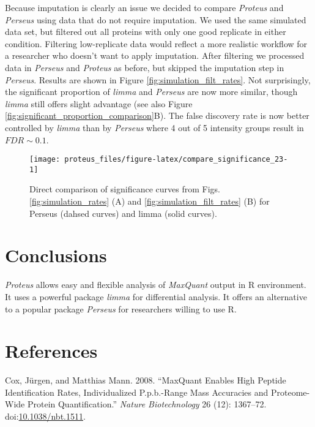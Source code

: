 \documentclass[]{article}
\begin{document}
Because imputation is clearly an issue we decided to compare
\emph{Proteus} and \emph{Perseus} using data that do not require
imputation. We used the same simulated data set, but filtered out all
proteins with only one good replicate in either condition. Filtering
low-replicate data would reflect a more realistic workflow for a
researcher who doesn't want to apply imputation. After filtering we
processed data in \emph{Perseus} and \emph{Proteus} as before, but
skipped the imputation step in \emph{Perseus}. Results are shown in
Figure \ref{fig:simulation_filt_rates}. Not surprisingly, the
significant proportion of \emph{limma} and \emph{Perseus} are now more
similar, though \emph{limma} still offers slight advantage (see also
Figure \ref{fig:significant_proportion_comparison}B). The false
discovery rate is now better controlled by \emph{limma} than by
\emph{Perseus} where 4 out of 5 intensity groups result in
\(FDR \sim 0.1\).

\begin{figure}[H]

{\centering \texttt{[image: proteus\_files/figure-latex/compare\_significance\_23-1]} 

}

\caption{\label{fig:significant_proportion_comparison}Direct comparison of significance curves from Figs. \ref{fig:simulation_rates} (A) and \ref{fig:simulation_filt_rates} (B) for Perseus (dahsed curves) and limma (solid curves).}\label{fig:compare_significance_23}
\end{figure}

\section{Conclusions}\label{conclusions}

\emph{Proteus} allows easy and flexible analysis of \emph{MaxQuant}
output in R environment. It uses a powerful package \emph{limma} for
differential analysis. It offers an alternative to a popular package
\emph{Perseus} for researchers willing to use R.

\section*{References}\label{references}

\hypertarget{refs}{}
\hypertarget{ref-coxmann2008}{}
Cox, Jürgen, and Matthias Mann. 2008. ``MaxQuant Enables High Peptide
Identification Rates, Individualized P.p.b.-Range Mass Accuracies and
Proteome-Wide Protein Quantification.'' \emph{Nature Biotechnology} 26
(12): 1367--72.
doi:\href{https://doi.org/10.1038/nbt.1511}{10.1038/nbt.1511}.
\end{document}
